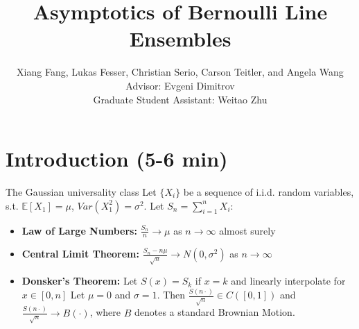 \documentclass[9pt,t]{beamer}
\title{Asymptotics of Bernoulli Line Ensembles}
\author[Fang, Fesser, Serio, Teitler, and Wang]{Xiang Fang, Lukas Fesser, Christian Serio, Carson Teitler, and Angela Wang \\
Advisor: Evgeni Dimitrov\\
Graduate Student Assistant: Weitao Zhu}
\institute[Columbia]{Columbia University REU}
\begin{document}
	
	\begin{frame}
		\maketitle
	\end{frame}


\section{Introduction (5-6 min)}

\begin{frame}{The Gaussian universality class}
Let $\{X_i\}$ be a sequence of i.i.d. random variables, s.t. $\mathbb{E}[X_1] = \mu$, $Var(X_1^2) = \sigma^2$. Let $S_n = \sum_{i = 1}^n X_i$:

\bigskip

\begin{itemize}
\item \textbf{Law of Large Numbers:} $\frac{S_n}{n} \rightarrow \mu$ as $n \rightarrow \infty$ almost surely

\bigskip

\item \textbf{Central Limit Theorem:} $\frac{S_n - n \mu}{\sqrt{n}} \rightarrow N(0, \sigma^2)$ as $n \rightarrow \infty$

\bigskip

\item \textbf{Donsker's Theorem:} Let $S(x) = S_k$ if $x = k$ and linearly interpolate for $x \in [0, n]$ Let $\mu = 0$ and $\sigma = 1$. Then $\frac{S(n\cdot)}{\sqrt{n}} \in C([0, 1])$ and $\frac{S(n\cdot)}{\sqrt{n}} \rightarrow B(\cdot)$, where $B$ denotes a standard Brownian Motion.

\end{itemize}


\end{frame}
\end{document}
